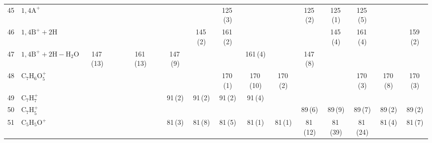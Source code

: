 \documentclass[]{article}
\begin{document}
\begin{table}
{\begin{tabular}{ll|ccccc|ccccc|ccccc}
  45 & $\mathrm{1{,}4A^+}$ &  &  &  &  &  &  &  & 125\,(3) &  &  & 125\,(2) & 125\,(1) & 125\,(5) &  &  \\ 
  46 & $\mathrm{1{,}4B^+{+}2H}$ &  &  &  &  &  &  & 145\,(2) & 161\,(2) &  &  &  & 145\,(4) & 161\,(4) &  & 159\,(2) \\ 
  47 & $\mathrm{1{,}4B^+{+}2H{-}H_{2}O}$ & 147\,(13) &  &  & 161\,(13) &  & 147\,(9) &  &  & 161\,(4) &  & 147\,(8) &  &  &  &  \\ 
  48 & $\mathrm{C_{7}H_{6}O_{5}^+}$ &  &  &  &  &  &  &  & 170\,(1) & 170\,(10) & 170\,(2) &  &  & 170\,(3) & 170\,(8) & 170\,(3) \\ 
  49 & $\mathrm{C_{7}H_{7}^+}$ &  &  &  &  &  & 91\,(2) & 91\,(2) & 91\,(2) & 91\,(4) &  &  &  &  &  &  \\ 
  50 & $\mathrm{C_{7}H_{5}^+}$ &  &  &  &  &  &  &  &  &  &  & 89\,(6) & 89\,(9) & 89\,(7) & 89\,(2) & 89\,(2) \\ 
  51 & $\mathrm{C_{5}H_{5}O^+}$ &  &  &  &  &  & 81\,(3) & 81\,(8) & 81\,(5) & 81\,(1) & 81\,(1) & 81\,(12) & 81\,(39) & 81\,(24) & 81\,(4) & 81\,(7) \\ 
   \bottomrule
\end{tabular}
}
\end{table}
\end{document}
